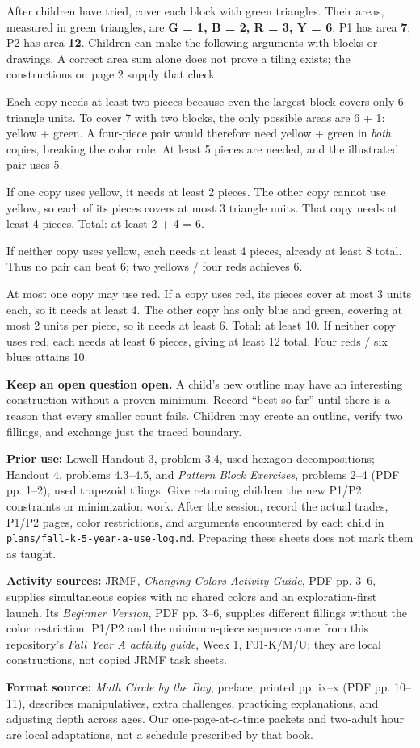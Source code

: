 \documentclass[11pt]{article}
\newcommand{\Subhead}[1]{\par\vspace{4pt}{\large\bfseries #1}\par}
\begin{document}
After children have tried, cover each block with green triangles. Their areas, measured in green triangles, are \textbf{G = 1, B = 2, R = 3, Y = 6}. P1 has area \textbf{7}; P2 has area \textbf{12}. Children can make the following arguments with blocks or drawings. A correct area sum alone does not prove a tiling exists; the constructions on page 2 supply that check.
\Subhead{P1: the minimum is 5 pieces across the pair}
Each copy needs at least two pieces because even the largest block covers only 6 triangle units. To cover 7 with two blocks, the only possible areas are 6 + 1: yellow + green. A four-piece pair would therefore need yellow + green in \emph{both} copies, breaking the color rule. At least 5 pieces are needed, and the illustrated pair uses 5.
\Subhead{P2: the minimum is 6 pieces across the pair}
If one copy uses yellow, it needs at least 2 pieces. The other copy cannot use yellow, so each of its pieces covers at most 3 triangle units. That copy needs at least 4 pieces. Total: at least 2 + 4 = 6.

If neither copy uses yellow, each needs at least 4 pieces, already at least 8 total. Thus no pair can beat 6; two yellows / four reds achieves 6.
\Subhead{P2 without yellow: the minimum is 10 pieces}
At most one copy may use red. If a copy uses red, its pieces cover at most 3 units each, so it needs at least 4. The other copy has only blue and green, covering at most 2 units per piece, so it needs at least 6. Total: at least 10. If neither copy uses red, each needs at least 6 pieces, giving at least 12 total. Four reds / six blues attains 10.
\Subhead{Extensions, recording, and sources}
\textbf{Keep an open question open.} A child's new outline may have an interesting construction without a proven minimum. Record ``best so far'' until there is a reason that every smaller count fails. Children may create an outline, verify two fillings, and exchange just the traced boundary.

\textbf{Prior use:} Lowell Handout 3, problem 3.4, used hexagon decompositions; Handout 4, problems 4.3--4.5, and \emph{Pattern Block Exercises}, problems 2--4 (PDF pp. 1--2), used trapezoid tilings. Give returning children the new P1/P2 constraints or minimization work. After the session, record the actual trades, P1/P2 pages, color restrictions, and arguments encountered by each child in \texttt{plans/fall-k-5-year-a-use-log.md}. Preparing these sheets does not mark them as taught.

\textbf{Activity sources:} JRMF, \emph{Changing Colors Activity Guide}, PDF pp. 3--6, supplies simultaneous copies with no shared colors and an exploration-first launch. Its \emph{Beginner Version}, PDF pp. 3--6, supplies different fillings without the color restriction. P1/P2 and the minimum-piece sequence come from this repository's \emph{Fall Year A activity guide}, Week 1, F01-K/M/U; they are local constructions, not copied JRMF task sheets.

\textbf{Format source:} \emph{Math Circle by the Bay}, preface, printed pp. ix--x (PDF pp. 10--11), describes manipulatives, extra challenges, practicing explanations, and adjusting depth across ages. Our one-page-at-a-time packets and two-adult hour are local adaptations, not a schedule prescribed by that book.
\end{document}
